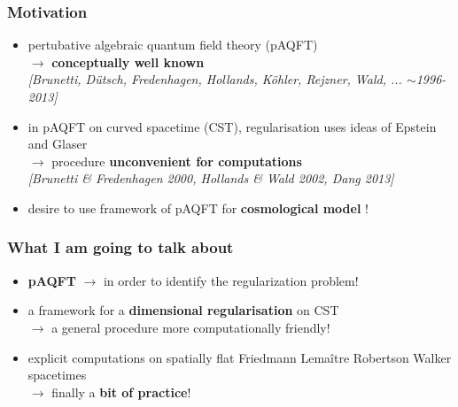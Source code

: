 \documentclass[9pt]{beamer}
\newcommand{\citebeam}[1]{\textit{\textcolor{black!60!white}{[#1]}}}
\begin{document}

\begin{frame}

\frametitle{Motivation}
  
\begin{itemize}
    
\item pertubative algebraic quantum field theory (pAQFT) \\
$\to$ \textbf{conceptually well known} \\
\citebeam{Brunetti, Dütsch, Fredenhagen, Hollands, K\"ohler, Rejzner, Wald, ... $\sim$1996-2013} \\
    
\item in pAQFT on curved spacetime (CST), regularisation uses ideas of Epstein and Glaser \\
$\to$ procedure \textbf{unconvenient for computations} \\
\citebeam{Brunetti \& Fredenhagen 2000, Hollands \& Wald 2002, Dang 2013} \\
    
\item desire to use framework of pAQFT for \textbf{cosmological model} ! 
  
\end{itemize}

\end{frame}


\begin{frame}

\frametitle{What I am going to talk about}
  
\begin{itemize}
   
\item \textbf{pAQFT} $\to$ in order to identify the regularization problem! \\
  
\item a framework for a \textbf{dimensional regularisation} on CST \\
$\to$ a general procedure more computationally friendly! \\
   
\item explicit computations on spatially flat Friedmann Lemaître Robertson Walker spacetimes \\
$\to$ finally a \textbf{bit of practice}!
   
\end{itemize}

\end{frame}
\end{document}
